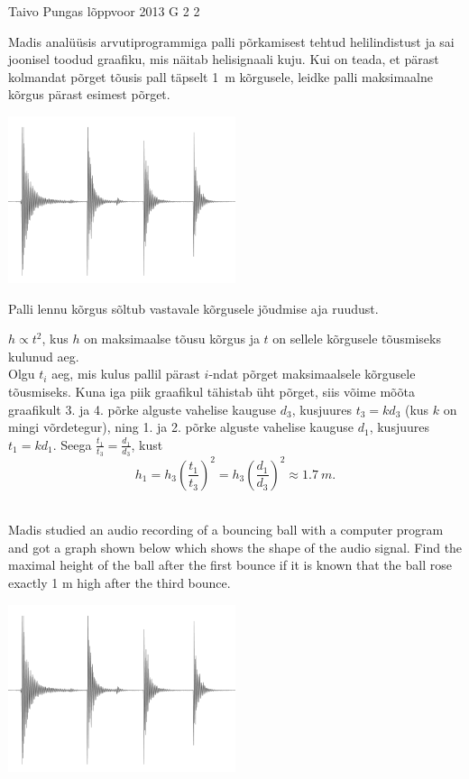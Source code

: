 {Taivo Pungas} %
{lõppvoor} %
{2013} %
{G 2} %
{2} %
{
\ifStatement
Madis analüüsis arvutiprogrammiga palli põrkamisest tehtud helilindistust
ja sai joonisel  toodud graafiku, mis näitab helisignaali kuju.
Kui on teada, et pärast kolmandat põrget tõusis pall täpselt \SI{1}{m} kõrgusele,
leidke palli maksimaalne kõrgus pärast esimest põrget.
\begin{center}
\includegraphics[width=0.5\textwidth]{2013-v3g-02-pall}%
\end{center}
\fi


\ifHint
Palli lennu kõrgus sõltub vastavale kõrgusele jõudmise aja ruudust.
\fi


\ifSolution
$h \propto t^{2}$, kus $h$ on maksimaalse tõusu kõrgus ja $t$ on sellele kõrgusele tõusmiseks kulunud aeg.\\
Olgu $t_{i}$ aeg, mis kulus pallil pärast $i$-ndat põrget maksimaalsele kõrgusele tõusmiseks. Kuna iga piik graafikul tähistab üht põrget, siis võime mõõta graafikult 3. ja 4. põrke alguste vahelise kauguse $d_{3}$, kusjuures $t_{3}=kd_{3}$ (kus $k$ on mingi võrdetegur), ning 1. ja 2. põrke alguste vahelise kauguse $d_{1}$, kusjuures $t_{1}=kd_{1}$. Seega 
$\frac{t_{1}}{t_{3}}=\frac{d_{1}}{d_{3}}$, kust
$$h_{1}=h_{3}(\frac{t_{1}}{t_{3}})^{2}=h_{3}(\frac{d_{1}}{d_{3}})^{2} \approx \SI{1,7}{m}.$$\\
\fi


\ifEngStatement
Madis studied an audio recording of a bouncing ball with a computer program and got a graph shown below which shows the shape of the audio signal. Find the maximal height of the ball after the first bounce if it is known that the ball rose exactly 1 m high after the third bounce.
\begin{center}
\includegraphics[width=0.5\textwidth]{2013-v3g-02-pall}%
\end{center}
\fi


}
